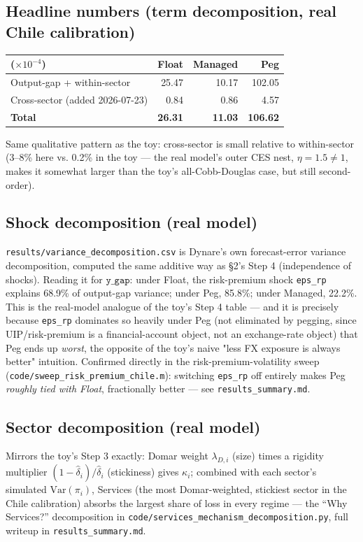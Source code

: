 \documentclass[12pt]{article}
\begin{document}
\subsection{Headline numbers (term decomposition, real Chile calibration)}
\begin{center}
\begin{tabular}{lrrr}
\toprule
($\times10^{-4}$) & Float & Managed & Peg \\
\midrule
Output-gap + within-sector & 25.47 & 10.17 & 102.05 \\
Cross-sector (added 2026-07-23) & 0.84 & 0.86 & 4.57 \\
\midrule
\textbf{Total} & \textbf{26.31} & \textbf{11.03} & \textbf{106.62} \\
\bottomrule
\end{tabular}
\end{center}
Same qualitative pattern as the toy: cross-sector is small relative to within-sector (3--8\% here vs.
0.2\% in the toy — the real model's outer CES nest, $\eta=1.5\neq1$, makes it somewhat larger than
the toy's all-Cobb-Douglas case, but still second-order).

\subsection{Shock decomposition (real model)}
\label{sec:regime}
\texttt{results/variance\_decomposition.csv} is Dynare's own forecast-error variance decomposition,
computed the same additive way as \S2's Step 4 (independence of shocks). Reading it for
$\mathtt{y\_gap}$: under Float, the risk-premium shock \texttt{eps\_rp} explains 68.9\% of output-gap
variance; under Peg, 85.8\%; under Managed, 22.2\%. This is the real-model analogue of the toy's
Step 4 table — and it is precisely because \texttt{eps\_rp} dominates so heavily under Peg (not
eliminated by pegging, since UIP/risk-premium is a financial-account object, not an exchange-rate
object) that Peg ends up \emph{worst}, the opposite of the toy's naive "less FX exposure is always
better" intuition. Confirmed directly in the risk-premium-volatility sweep
(\texttt{code/sweep\_risk\_premium\_chile.m}): switching \texttt{eps\_rp} off entirely makes Peg
\emph{roughly tied with Float}, fractionally better — see \texttt{results\_summary.md}.

\subsection{Sector decomposition (real model)}
Mirrors the toy's Step 3 exactly: Domar weight $\lambda_{D,i}$ (size) times a rigidity multiplier
$(1-\hat\delta_i)/\hat\delta_i$ (stickiness) gives $\kappa_i$; combined with each sector's simulated
$\mathrm{Var}(\pi_i)$, Services (the most Domar-weighted, stickiest sector in the Chile calibration)
absorbs the largest share of loss in every regime — the ``Why Services?'' decomposition in
\texttt{code/services\_mechanism\_decomposition.py}, full writeup in \texttt{results\_summary.md}.
\end{document}
